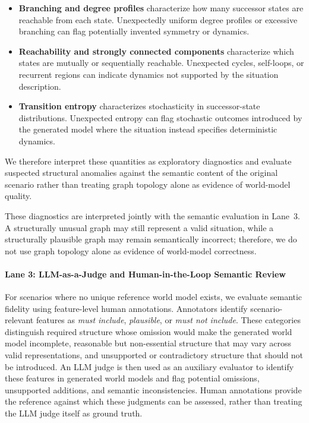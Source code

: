 \documentclass{article}
\begin{document}
\begin{itemize}
    \item \textbf{Branching and degree profiles} characterize how many successor states are reachable from each state. Unexpectedly uniform degree profiles or excessive branching can flag potentially invented symmetry or dynamics.

    \item \textbf{Reachability and strongly connected components} characterize which states are mutually or sequentially reachable. Unexpected cycles, self-loops, or recurrent regions can indicate dynamics not supported by the situation description.

    \item \textbf{Transition entropy} characterizes stochasticity in successor-state distributions. Unexpected entropy can flag stochastic outcomes introduced by the generated model where the situation instead specifies deterministic dynamics.
\end{itemize}

We therefore interpret these quantities as exploratory diagnostics and evaluate suspected structural anomalies against the semantic content of the original scenario rather than treating graph topology alone as evidence of world-model quality.

These diagnostics are interpreted jointly with the semantic evaluation in Lane~3. A structurally unusual graph may still represent a valid situation, while a structurally plausible graph may remain semantically incorrect; therefore, we do not use graph topology alone as evidence of world-model correctness.



\paragraph{Lane 3: LLM-as-a-Judge and Human-in-the-Loop Semantic Review}
For scenarios where no unique reference world model exists, we evaluate semantic fidelity using feature-level human annotations. Annotators identify scenario-relevant features as \textit{must include}, \textit{plausible}, or \textit{must not include}. These categories distinguish required structure whose omission would make the generated world model incomplete, reasonable but non-essential structure that may vary across valid representations, and unsupported or contradictory structure that should not be introduced. An LLM judge is then used as an auxiliary evaluator to identify these features in generated world models and flag potential omissions, unsupported additions, and semantic inconsistencies. Human annotations provide the reference against which these judgments can be assessed, rather than treating the LLM judge itself as ground truth.
\end{document}
